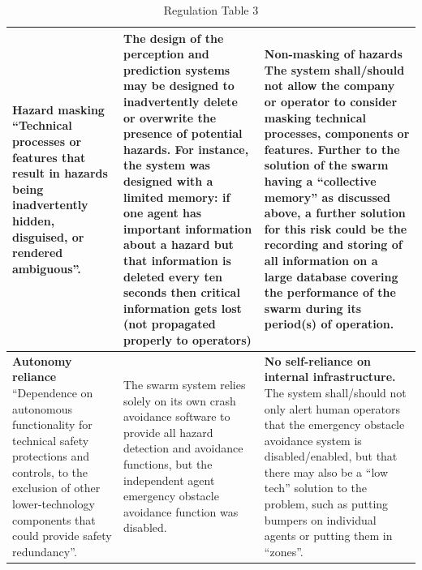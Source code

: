 \documentclass[lettersize,journal]{IEEEtran}
\begin{document}
\begin{landscape}
\begin{table}[]
\begin{tabular}{|p{0.3\textheight}|p{0.35\textheight}|p{0.35\textheight}|}
        \textbf{Hazard masking} ``Technical processes or features that result in hazards being inadvertently hidden, disguised, or rendered ambiguous”. \cite{macrae2021learning} & The design of the perception and prediction systems may be designed to inadvertently delete or overwrite the presence of potential hazards. For instance, the system was designed with a limited memory: if one agent has important information about a hazard but that information is deleted every ten seconds then critical information gets lost (not propagated properly to operators) & \textbf{Non-masking of hazards} The system shall/should not allow the company or operator to consider masking technical processes, components or features. Further to the solution of the swarm having a ``collective memory” \cite{wilson2022information} as discussed above, a further solution for this risk could be the recording and storing of all information on a large database covering the performance of the swarm during its period(s) of operation.\\
        \hline
        \textbf{Autonomy reliance } ``Dependence on autonomous functionality for technical safety protections and controls, to the exclusion of other lower-technology components that could provide safety redundancy”. \cite{macrae2021learning} & The swarm system relies solely on its own crash avoidance software to provide all hazard detection and avoidance functions, but the independent agent emergency obstacle avoidance function was disabled. &	\textbf{No self-reliance on internal infrastructure.} The system shall/should not only alert human operators that the emergency obstacle avoidance system is disabled/enabled, but that there may also be a ``low tech” solution to the problem, such as putting bumpers on individual agents or putting them in ``zones”.\\
        \hline
    \end{tabular}
    \caption{Regulation Table 3}
    \label{tab:reg_3}
\end{table}
\end{landscape}
\end{document}
